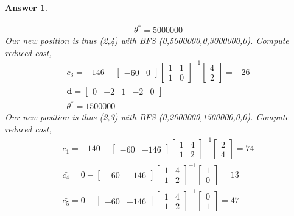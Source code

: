 \documentclass[12pt]{article}
\theoremstyle{colon}
\newtheorem*{answer}{Answer}
\begin{document}
\begin{answer}
\begin{enumerate}[label=\arabic*)]
\begin{gather*}
        \theta^* = 5000000
      \end{gather*}
      Our new position is thus (2,4) with BFS (0,5000000,0,3000000,0). Compute reduced cost,
      \begin{gather*}
        \bar{c_3} = -146 - \begin{bmatrix} -60 & 0 \end{bmatrix}\begin{bmatrix}
          1 & 1 \\
          1 & 0
        \end{bmatrix}^{-1} \begin{bmatrix} 4 \\ 2 \end{bmatrix} = -26 \\
        \textbf{d} = \begin{bmatrix} 0 & -2 & 1 & -2 & 0 \end{bmatrix} \\
        \theta^* = 1500000
      \end{gather*}
      Our new position is thus (2,3) with BFS (0,2000000,1500000,0,0). Compute reduced cost,
      \begin{gather*}
        \bar{c_1} = -140 - \begin{bmatrix} -60 & -146 \end{bmatrix}\begin{bmatrix}
          1 & 4 \\
          1 & 2
        \end{bmatrix}^{-1} \begin{bmatrix} 2 \\ 4 \end{bmatrix} = 74 \\
        \bar{c_4} = 0 - \begin{bmatrix} -60 & -146 \end{bmatrix}\begin{bmatrix}
          1 & 4 \\
          1 & 2
        \end{bmatrix}^{-1} \begin{bmatrix} 1 \\ 0 \end{bmatrix} = 13 \\
        \bar{c_5} = 0 - \begin{bmatrix} -60 & -146 \end{bmatrix}\begin{bmatrix}
          1 & 4 \\
          1 & 2
        \end{bmatrix}^{-1} \begin{bmatrix} 0 \\ 1 \end{bmatrix} = 47 \\

\end{gather*}
\end{enumerate}
\end{answer}
\end{document}
